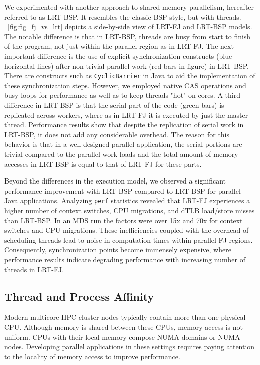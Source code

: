 \documentclass[10pt, conference, compsocconf]{IEEEtran}
\begin{document}
We experimented with another approach to shared memory parallelism, hereafter referred to as \ac{LRT-BSP}. It resembles the classic \ac{BSP} style, but with threads. \figurename~\ref{fig:fig_fj_vs_lrt} depicts a side-by-side view of \ac{LRT-FJ} and \ac{LRT-BSP} models. The notable difference is that in \ac{LRT-BSP}, threads are busy from start to finish of the program, not just within the parallel region as in \ac{LRT-FJ}. The next important difference is the use of explicit synchronization constructs (blue horizontal lines) after non-trivial parallel work (red bars in figure) in \ac{LRT-BSP}. There are constructs such as \texttt{CyclicBarrier} in Java to aid the implementation of these synchronization steps. However, we employed native \ac{CAS} operations and busy loops for performance as well as to keep threads "hot" on cores.  A third difference in \ac{LRT-BSP} is that the serial part of the code (green bars) is replicated across workers, where as in \ac{LRT-FJ} it is executed by just the master thread. Performance results show that despite the replication of serial work in \ac{LRT-BSP}, it does not add any considerable overhead. The reason for this behavior is that in a well-designed parallel application, the serial portions are trivial compared to the parallel work loads and the total amount of memory accesses in \ac{LRT-BSP} is equal to that of \ac{LRT-FJ} for these parts. 

Beyond the differences in the execution model, we observed a significant performance improvement with \ac{LRT-BSP} compared to \ac{LRT-BSP} for parallel Java applications. Analyzing \texttt{perf} statistics revealed that \ac{LRT-FJ} experiences a higher number of context switches, \acs{CPU} migrations, and \ac{dTLB} load/store misses than \ac{LRT-BSP}. In an \ac{MDS} run the factors were over 15x and 70x for context switches and \acs{CPU} migrations. These inefficiencies coupled with the overhead of scheduling threads lead to noise in computation times within parallel \ac{FJ} regions. Consequently, synchronization points become immensely expensive, where performance results indicate degrading performance with increasing number of threads in \ac{LRT-FJ}.


\subsection{Thread and Process Affinity}
Modern multicore \ac{HPC} cluster nodes typically contain more than one physical \acs{CPU}. Although memory is shared between these \acp{CPU}, memory access is not uniform. \acp{CPU} with their local memory compose \ac{NUMA} domains or \ac{NUMA} nodes. Developing parallel applications in these settings requires paying attention to the locality of memory access to improve performance.
\end{document}
